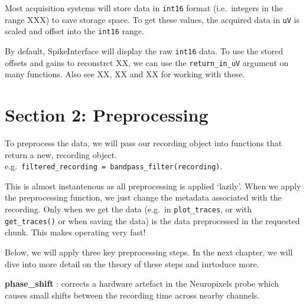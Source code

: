\documentclass[
  letterpaper,
  DIV=11,
  numbers=noendperiod]{scrreprt}
\begin{document}
\begin{tcolorbox}[enhanced jigsaw, arc=.35mm, bottomrule=.15mm, bottomtitle=1mm, breakable, colback=white, colbacktitle=quarto-callout-note-color!10!white, colframe=quarto-callout-note-color-frame, coltitle=black, left=2mm, leftrule=.75mm, opacityback=0, opacitybacktitle=0.6, rightrule=.15mm, title=\textcolor{quarto-callout-note-color}{\faInfo}\hspace{0.5em}{A note on scaling to \texttt{uV}}, titlerule=0mm, toprule=.15mm, toptitle=1mm]

Most acquisition systems will store data in \texttt{int16} format
(i.e.~integers in the range XXX) to save storage space. To get these
values, the acquired data in \texttt{uV} is scaled and offset into the
\texttt{int16} range.

By default, SpikeInterface will display the raw \texttt{int16} data. To
use the stored offsets and gains to reconstrct XX, we can use the
\texttt{return\_in\_uV} argument on many functions. Also see XX, XX and
XX for working with these.

\end{tcolorbox}

\section*{Section 2: Preprocessing}\label{section-2-preprocessing}


To preprocess the data, we will pass our recording object into functions
that return a new, recording object.
e.g.~\texttt{filtered\_recording\ =\ bandpass\_filter(recording)}.

This is almost instantenous as all preprocessing is applied `lazily'.
When we apply the preprocessing function, we just change the metadata
associated with the recording. Only when we get the data (e.g.~in
\texttt{plot\_traces}, or with \texttt{get\_traces()} or when saving the
data) is the data preprocessed in the requested chunk. This makes
operating very fast!

Below, we will apply three key preprocessing steps. In the next chapter,
we will dive into more detail on the theory of these steps and inrtoduce
more.

\textbf{phase\_shift} : corrects a hardware artefact in the Neuropixels
probe which causes small shifts between the recording time across nearby
channels.
\end{document}
